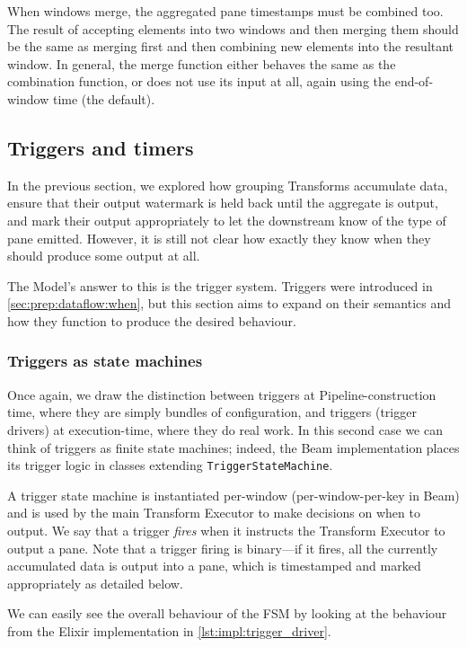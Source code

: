 When windows merge, the aggregated pane timestamps must be combined too.
The result of accepting elements into two windows and then merging them should be the same as merging first and then combining new elements into the resultant window.
In general, the merge function either behaves the same as the combination function, or does not use its input at all, again using the end-of-window time (the default).

\subsection{Triggers and timers}

In the previous section, we explored how grouping Transforms accumulate data, ensure that their output watermark is held back until the aggregate is output, and mark their output appropriately to let the downstream know of the type of pane emitted.
However, it is still not clear how exactly they know when they should produce some output at all.

The Model's answer to this is the trigger system.
Triggers were introduced in \cref{sec:prep:dataflow:when}, but this section aims to expand on their semantics and how they function to produce the desired behaviour.

\subsubsection{Triggers as state machines}
Once again, we draw the distinction between triggers at Pipeline-construction time, where they are simply bundles of configuration, and triggers (trigger drivers) at execution-time, where they do real work.
In this second case we can think of triggers as finite state machines; indeed, the Beam implementation places its trigger logic in classes extending \verb|TriggerStateMachine|.

A trigger state machine is instantiated per-window (per-window-per-key in Beam) and is used by the main Transform Executor to make decisions on when to output.
We say that a trigger \emph{fires} when it instructs the Transform Executor to output a pane.
Note that a trigger firing is binary---if it fires, all the currently accumulated data is output into a pane, which is timestamped and marked appropriately as detailed below.

We can easily see the overall behaviour of the FSM by looking at the  behaviour from the Elixir implementation in \cref{lst:impl:trigger_driver}.\footnotemark

